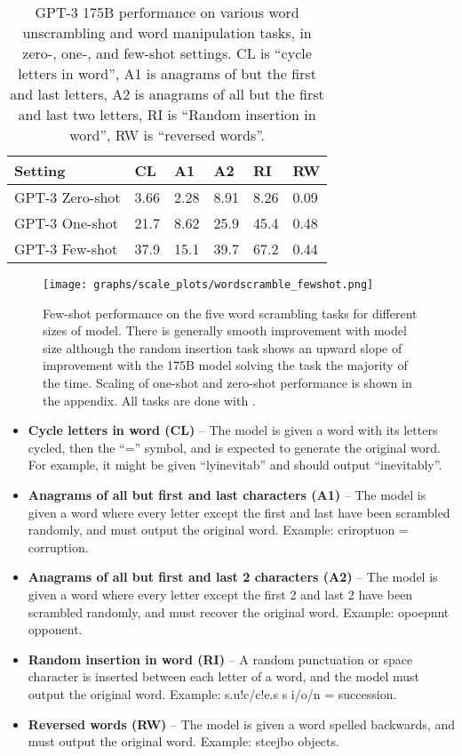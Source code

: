 \documentclass{article}
\begin{document}
\begin{table}
    \centering
        \begin{tabular}{l l l l l l}
        \toprule
        Setting & CL & A1 & A2 & RI & RW \\ 
        \midrule
        GPT-3 Zero-shot & 3.66 & 2.28 & 8.91 & 8.26 & 0.09 \\
        GPT-3 One-shot & 21.7 & 8.62 & 25.9 & 45.4 & 0.48 \\ 
        GPT-3 Few-shot & 37.9 & 15.1 & 39.7 & 67.2 & 0.44 \\ 
        \bottomrule
        \end{tabular}
    \caption{GPT-3 175B performance on various word unscrambling and word
manipulation tasks, in zero-, one-, and few-shot settings. CL is ``cycle letters in word'', A1 is anagrams of but the first and last letters,
A2 is anagrams of all but the first and last two letters, RI is ``Random insertion
in word'', RW is ``reversed words''.}
    \label{table:unscramble}
\end{table} \begin{figure}
\centering\texttt{[image: graphs/scale\_plots/wordscramble\_fewshot.png]}
\caption{Few-shot performance on the five word scrambling tasks for different sizes of model.  There is generally smooth improvement with model size although the random insertion task shows an upward slope of improvement with the 175B model solving the task the majority of the time.  Scaling of one-shot and zero-shot performance is shown in the appendix.  All tasks are done with .}
\label{graph:scramble}
\end{figure} 
\begin{itemize}
    \item \textbf{Cycle letters in word (CL)} -- The model is given a word with its letters cycled, then the ``='' symbol, and is expected to generate the original word.  For example, it might be given ``lyinevitab'' and should output ``inevitably''.
    \item \textbf{Anagrams of all but first and last characters (A1)} -- The model is given a word where every letter except the first and last have been scrambled randomly, and must output the original word.  Example: criroptuon = corruption.
    \item \textbf{Anagrams of all but first and last 2 characters (A2)} -- The model is given a word where every letter except the first 2 and last 2 have been scrambled randomly, and must recover the original word.  Example: opoepnnt  opponent.
    \item \textbf{Random insertion in word (RI)} -- A random punctuation or space character is inserted between each letter of a word, and the model must output the original word.  Example: s.u!c/c!e.s s i/o/n = succession.
    \item \textbf{Reversed words (RW)} -- The model is given a word spelled backwards, and must output the original word.  Example: stcejbo  objects.
\end{itemize}
\end{document}
